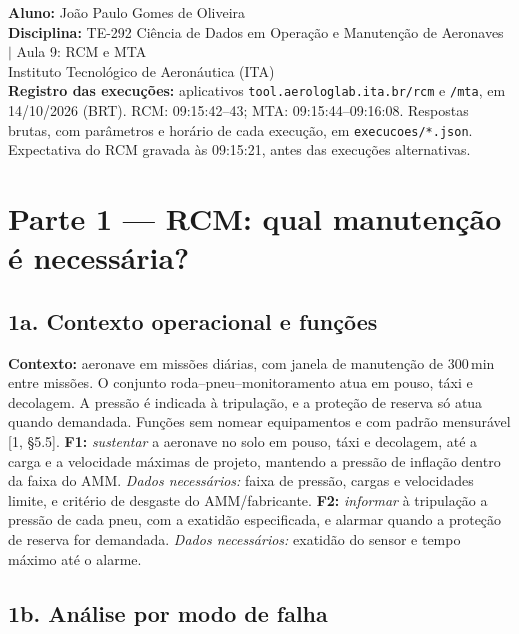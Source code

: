 \documentclass[11pt,a4paper]{article}
\begin{document}
\textbf{Aluno:} João Paulo Gomes de Oliveira\\
\textbf{Disciplina:} TE-292 Ciência de Dados em Operação e Manutenção de Aeronaves $|$ Aula 9: RCM e MTA\\
Instituto Tecnológico de Aeronáutica (ITA)\\[2pt]
{\small\textbf{Registro das execuções:} aplicativos \texttt{tool.aerologlab.ita.br/rcm} e \texttt{/mta}, em 14/10/2026 (BRT). RCM: 09:15:42--43; MTA: 09:15:44--09:16:08. Respostas brutas, com parâmetros e horário de cada execução, em \texttt{execucoes/*.json}. Expectativa do RCM gravada às 09:15:21, antes das execuções alternativas.}

\section*{Parte 1 --- RCM: qual manutenção é necessária?}
\subsection*{1a. Contexto operacional e funções}
\textbf{Contexto:} aeronave em missões diárias, com janela de manutenção de 300\,min entre missões. O conjunto roda--pneu--monitoramento atua em pouso, táxi e decolagem. A pressão é indicada à tripulação, e a proteção de reserva só atua quando demandada. Funções sem nomear equipamentos e com padrão mensurável [1, §5.5].
\textbf{F1:} \emph{sustentar} a aeronave no solo em pouso, táxi e decolagem, até a carga e a velocidade máximas de projeto, mantendo a pressão de inflação dentro da faixa do AMM. \emph{Dados necessários:} faixa de pressão, cargas e velocidades limite, e critério de desgaste do AMM/fabricante.
\textbf{F2:} \emph{informar} à tripulação a pressão de cada pneu, com a exatidão especificada, e alarmar quando a proteção de reserva for demandada. \emph{Dados necessários:} exatidão do sensor e tempo máximo até o alarme.

\subsection*{1b. Análise por modo de falha}
\end{document}
